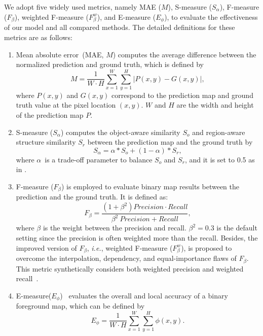 \documentclass[lettersize,journal]{IEEEtran}
\def\ie{\emph{i.e.}}
\begin{document}
We adopt five widely used metrics, namely MAE ($M$), S-measure ({$S_\alpha$}), F-measure ({$F_\beta$}), weighted F-measure ({$F_\beta^w$}), and E-measure ({$E_\phi$}), to evaluate the effectiveness of our model and all compared methods. The detailed definitions for these metrics are as follows:\par
\begin{enumerate}
	\item Mean absolute error~(MAE, $M$) computes the average difference between the normalized prediction and ground truth, which is defined by%
	\begin{equation}
	M = \frac{1}{W\cdot H}\sum_{x=1}^{W} \sum_{y=1}^{H}|P(x,y)-G(x,y)|,
	\end{equation}%
	where $P(x,y)$ and $G(x,y)$ correspond to the prediction map and ground truth value at the pixel location $(x,y)$. $W$ and $H$ are the width and height of the prediction map $P$.
	
	\item S-measure ({$S_\alpha$}) \cite{sm} computes the object-aware similarity $S_o$ and region-aware structure similarity $S_r$ between the prediction map and the ground truth by
	\begin{equation}
	S_\alpha =\alpha * S_o + (1 - \alpha) *S_r,
	\end{equation}%
	where $\alpha$~is a trade-off parameter to balance $S_o$ and $S_r$, and it is set to 0.5 as in \cite{sm}.
	
	\item F-measure ({$F_\beta$}) is employed to evaluate binary map results between the prediction and the ground truth. It is defined as:
	\begin{equation}
	F_\beta = \frac{(1+ \beta^2)Precision \cdot Recall}{\beta^2\ Precision +Recall},
	\end{equation}
	where $\beta$ is the weight between the precision and recall. $\beta^2=0.3$ is the default setting since the precision is often weighted more than the recall. Besides, the improved version of $F_\beta$, \ie, weighted F-measure ({$F_\beta^w$}), is proposed to overcome the interpolation, dependency, and equal-importance flaws of $F_\beta$. This metric synthetically considers both weighted precision and weighted recall~\cite{fm}.
	
	\item E-measure({$E_\phi$})~\cite{em,21Fan_HybridLoss} evaluates the overall and local accuracy of a binary foreground map, which can be defined by
	\begin{equation}
	E_\phi = \frac{1}{W\cdot H}\sum_{x=1}^{W} \sum_{y=1}^{H}\phi(x,y).
	\end{equation}%
\end{enumerate}
\end{document}
